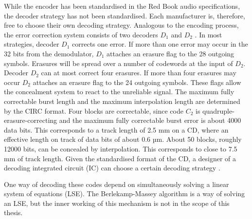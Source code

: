\documentclass[../main.tex]{subfiles}
\begin{document}
    While the encoder has been standardised in the Red Book audio specifications, the decoder strategy has not been standardised. Each manufacturer is, therefore, free to choose their own decoding strategy. Analogous to the encoding process, the error correction system consists of two decoders $D_1$ and $D_2$ . In most strategies, decoder $D_1$ corrects one error. If more than one error may occur in the 32 bits from the demodulator, $D_1$ attaches an erasure flag to the 28 outgoing symbols. Erasures will be spread over a number of codewords at the input of $D_2$. Decoder $D_2$ can at most correct four erasures. If more than four erasures may occur $D_2$ attaches an erasure flag to the 24 outgoing symbols. These flags allow the concealment system to react to the unreliable signal. The maximum fully correctable burst length and the maximum interpolation length are determined by the CIRC format. Four blocks are correctable, since code $C_2$ is quadruple-erasure-correcting and the maximum fully correctable burst error is about 4000 data bits. This corresponds to a track length of 2.5 mm on a CD, where an effective length on track of data bits of about 0.6 µm. About 50 blocks, roughly 12000 bits, can be concealed by interpolation. This corresponds to close to 7.5 mm of track length. Given the standardised format of the CD, a designer of a decoding integrated circuit (IC) can choose a certain decoding strategy \autocite{wicker1999reed}.

    One way of decoding these codes depend on simultaneously solving a linear system of equations (LSE). The Berlekamp-Massey algorithm is a way of solving an LSE, but the inner working of this mechanism is not in the scope of this thesis.
\end{document}
